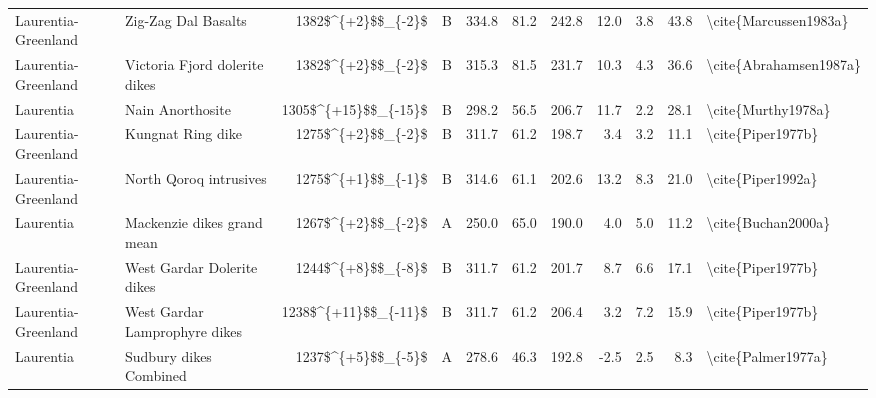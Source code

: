 \begin{longtable}{p{1 in}p{1 in}rrrrrrrr}
           Laurentia-Greenland &                              Zig-Zag Dal Basalts &     1382\$\textasciicircum \{+2\}\$\$\_\{-2\}\$ &      B &     334.8 &      81.2 & 242.8 &  12.0 &       3.8 &        43.8 &                              \textbackslash cite\{Marcussen1983a\} \\
           Laurentia-Greenland &                    Victoria Fjord dolerite dikes &     1382\$\textasciicircum \{+2\}\$\$\_\{-2\}\$ &      B &     315.3 &      81.5 & 231.7 &  10.3 &       4.3 &        36.6 &                             \textbackslash cite\{Abrahamsen1987a\} \\
                     Laurentia &                                 Nain Anorthosite &   1305\$\textasciicircum \{+15\}\$\$\_\{-15\}\$ &      B &     298.2 &      56.5 & 206.7 &  11.7 &       2.2 &        28.1 &                                 \textbackslash cite\{Murthy1978a\} \\
           Laurentia-Greenland &                                Kungnat Ring dike &     1275\$\textasciicircum \{+2\}\$\$\_\{-2\}\$ &      B &     311.7 &      61.2 & 198.7 &   3.4 &       3.2 &        11.1 &                                  \textbackslash cite\{Piper1977b\} \\
           Laurentia-Greenland &                           North Qoroq intrusives &     1275\$\textasciicircum \{+1\}\$\$\_\{-1\}\$ &      B &     314.6 &      61.1 & 202.6 &  13.2 &       8.3 &        21.0 &                                  \textbackslash cite\{Piper1992a\} \\
                     Laurentia &                       Mackenzie dikes grand mean &     1267\$\textasciicircum \{+2\}\$\$\_\{-2\}\$ &      A &     250.0 &      65.0 & 190.0 &   4.0 &       5.0 &        11.2 &                                 \textbackslash cite\{Buchan2000a\} \\
           Laurentia-Greenland &                       West Gardar Dolerite dikes &     1244\$\textasciicircum \{+8\}\$\$\_\{-8\}\$ &      B &     311.7 &      61.2 & 201.7 &   8.7 &       6.6 &        17.1 &                                  \textbackslash cite\{Piper1977b\} \\
           Laurentia-Greenland &                    West Gardar Lamprophyre dikes &   1238\$\textasciicircum \{+11\}\$\$\_\{-11\}\$ &      B &     311.7 &      61.2 & 206.4 &   3.2 &       7.2 &        15.9 &                                  \textbackslash cite\{Piper1977b\} \\
                     Laurentia &                           Sudbury dikes Combined &     1237\$\textasciicircum \{+5\}\$\$\_\{-5\}\$ &      A &     278.6 &      46.3 & 192.8 &  -2.5 &       2.5 &         8.3 &                                 \textbackslash cite\{Palmer1977a\} \\

\end{longtable}
